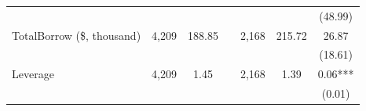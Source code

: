 \begin{table}[ht!]
\begin{tabular*}{\linewidth}{@{\extracolsep{\fill}}lcccccc }
          &       &       &       &       &       & (48.99) \\
    TotalBorrow (\$, thousand) & 4,209 & 188.85 &       & 2,168 & 215.72 & 26.87 \\
          &       &       &       &       &       & (18.61) \\
    Leverage & 4,209 & 1.45  &       & 2,168 & 1.39  & 0.06*** \\
          &       &       &       &       &       & (0.01) \\
    \bottomrule
          \end{tabular*} 



\end{table}%





